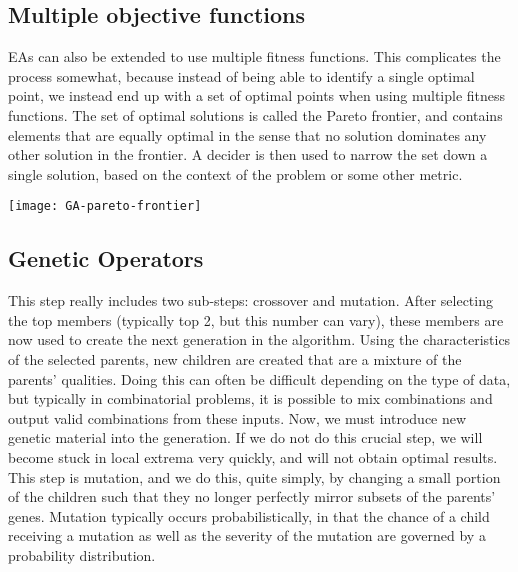 \subsection{Multiple objective functions}

EAs can also be extended to use multiple fitness functions. This complicates the process somewhat, because instead of being able to identify a single optimal point, we instead end up with a set of optimal points when using multiple fitness functions. The set of optimal solutions is called the Pareto frontier, and contains elements that are equally optimal in the sense that no solution dominates any other solution in the frontier. A decider is then used to narrow the set down a single solution, based on the context of the problem or some other metric.


\begin{marginfigure}
\texttt{[image: GA-pareto-frontier]}
\end{marginfigure}


\subsection{Genetic Operators}

This step really includes two sub-steps: crossover and mutation. After selecting the top members (typically top 2, but this number can vary), these members are now used to create the next generation in the algorithm. Using the characteristics of the selected parents, new children are created that are a mixture of the parents’ qualities. Doing this can often be difficult depending on the type of data, but typically in combinatorial problems, it is possible to mix combinations and output valid combinations from these inputs. Now, we must introduce new genetic material into the generation. If we do not do this crucial step, we will become stuck in local extrema very quickly, and will not obtain optimal results. This step is mutation, and we do this, quite simply, by changing a small portion of the children such that they no longer perfectly mirror subsets of the parents’ genes. Mutation typically occurs probabilistically, in that the chance of a child receiving a mutation as well as the severity of the mutation are governed by a probability distribution.


